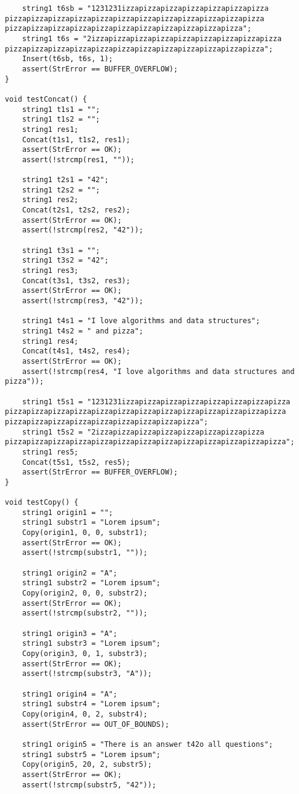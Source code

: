 \documentclass[a4paper,14pt]{extarticle}
\begin{document}
\begin{enumerate}
\begin{verbatim}
    string1 t6sb = "1231231izzapizzapizzapizzapizzapizzapizza
pizzapizzapizzapizzapizzapizzapizzapizzapizzapizzapizzapizza
pizzapizzapizzapizzapizzapizzapizzapizzapizzapizzapizza";
    string1 t6s = "2izzapizzapizzapizzapizzapizzapizzapizzapizza
pizzapizzapizzapizzapizzapizzapizzapizzapizzapizzapizzapizza";
    Insert(t6sb, t6s, 1);
    assert(StrError == BUFFER_OVERFLOW);
}

void testConcat() {
    string1 t1s1 = "";
    string1 t1s2 = "";
    string1 res1;
    Concat(t1s1, t1s2, res1);
    assert(StrError == OK);
    assert(!strcmp(res1, ""));

    string1 t2s1 = "42";
    string1 t2s2 = "";
    string1 res2;
    Concat(t2s1, t2s2, res2);
    assert(StrError == OK);
    assert(!strcmp(res2, "42"));

    string1 t3s1 = "";
    string1 t3s2 = "42";
    string1 res3;
    Concat(t3s1, t3s2, res3);
    assert(StrError == OK);
    assert(!strcmp(res3, "42"));

    string1 t4s1 = "I love algorithms and data structures";
    string1 t4s2 = " and pizza";
    string1 res4;
    Concat(t4s1, t4s2, res4);
    assert(StrError == OK);
    assert(!strcmp(res4, "I love algorithms and data structures and pizza"));

    string1 t5s1 = "1231231izzapizzapizzapizzapizzapizzapizzapizza
pizzapizzapizzapizzapizzapizzapizzapizzapizzapizzapizzapizzapizza
pizzapizzapizzapizzapizzapizzapizzapizzapizza";
    string1 t5s2 = "2izzapizzapizzapizzapizzapizzapizzapizza
pizzapizzapizzapizzapizzapizzapizzapizzapizzapizzapizzapizzapizza";
    string1 res5;
    Concat(t5s1, t5s2, res5);
    assert(StrError == BUFFER_OVERFLOW);
}

void testCopy() {
    string1 origin1 = "";
    string1 substr1 = "Lorem ipsum";
    Copy(origin1, 0, 0, substr1);
    assert(StrError == OK);
    assert(!strcmp(substr1, ""));

    string1 origin2 = "A";
    string1 substr2 = "Lorem ipsum";
    Copy(origin2, 0, 0, substr2);
    assert(StrError == OK);
    assert(!strcmp(substr2, ""));

    string1 origin3 = "A";
    string1 substr3 = "Lorem ipsum";
    Copy(origin3, 0, 1, substr3);
    assert(StrError == OK);
    assert(!strcmp(substr3, "A"));

    string1 origin4 = "A";
    string1 substr4 = "Lorem ipsum";
    Copy(origin4, 0, 2, substr4);
    assert(StrError == OUT_OF_BOUNDS);

    string1 origin5 = "There is an answer t42o all questions";
    string1 substr5 = "Lorem ipsum";
    Copy(origin5, 20, 2, substr5);
    assert(StrError == OK);
    assert(!strcmp(substr5, "42"));


\end{verbatim}
\end{enumerate}
\end{document}
